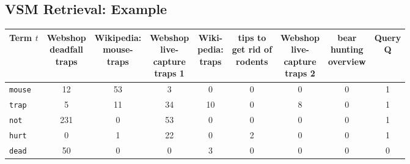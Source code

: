 \documentclass[a4paper, 11pt, accentcolor = tud3b]{tudreport}
\begin{document}
            \subsection{VSM Retrieval: Example} %
                \begin{table}[H]
                    \centering
                    \begin{tabular}{|l|c|c|c|c|c|c|c||c|}
                        \hline
                        \textbf{Term} \(t\) & \makecell{Webshop \\ deadfall \\ traps} & \makecell{Wikipedia: \\ mouse- \\ traps} & \makecell{Webshop \\ live- \\ capture \\ traps 1} & \makecell{Wiki- \\ pedia: \\ traps} & \makecell{tips to \\ get rid of \\ rodents} & \makecell{Webshop \\ live- \\ capture \\ traps 2} & \makecell{bear \\ hunting \\ overview} & \makecell{Query \\ Q} \\ \hline
                        \texttt{mouse}  &         12         &         53         &         3          & \textcolor{irl}{0} & \textcolor{irl}{0} & \textcolor{irl}{0} & \textcolor{irl}{0} & 1 \\ \hline
                        \texttt{trap}   &         5          &         11         &         34         &         10         & \textcolor{irl}{0} &         8          & \textcolor{irl}{0} & 1 \\ \hline
                        \texttt{not}    &        231         & \textcolor{irl}{0} &         53         & \textcolor{irl}{0} & \textcolor{irl}{0} & \textcolor{irl}{0} & \textcolor{irl}{0} & 1 \\ \hline
                        \texttt{hurt}   & \textcolor{irl}{0} &         1          &         22         & \textcolor{irl}{0} &         2          & \textcolor{irl}{0} & \textcolor{irl}{0} & 1 \\ \hline
                        \texttt{dead}   &         50         & \textcolor{irl}{0} & \textcolor{irl}{0} &         3          & \textcolor{irl}{0} & \textcolor{irl}{0} & \textcolor{irl}{0} & 0 \\ \hline

\end{tabular}
\end{table}
\end{document}
